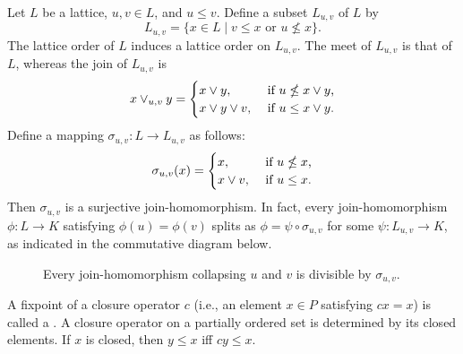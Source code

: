 \newcommand{\Luv}{\ensuremath{L_{u,v}}}
\newcommand{\juv}{\ensuremath{\vee_{u,v}}}
\newcommand{\suv}{\ensuremath{\sigma_{u,v}}}
\begin{example}
  Let $L$ be a lattice, $u, v \in L$, and $u\leq v$.
  Define a subset $\Luv$ of $L$ by
  \[
  \Luv =\{x\in L \mid v\leq x \text{ or } u \nleq x\}.
  \]
  The lattice order of $L$ induces a lattice order on $\Luv$.
  The meet of $\Luv$ is that of $L$, whereas the join of $\Luv$ is
  \[
  x \juv y = 
  \begin{cases}
    x \join y, & \text{ if $u \nleq x \join y$,}\\
    x \join y \join v, & \text{ if $u \leq x \join y$.}
  \end{cases}
  \]
  Define a mapping $\suv \colon L \to \Luv$ as follows:
  \[
  \suv (x)  = 
  \begin{cases}
    x, & \text{ if $u \nleq x$,}\\
    x \join v, & \text{ if $u \leq x$.}
  \end{cases}
  \]
  Then $\suv$ is a surjective join-homomorphism. In fact, every
  join-homomorphism $\phi \colon L \to K$ satisfying $\phi(u) = \phi(v)$ splits as
  $\phi =  \psi \circ \suv$ for some $\psi \colon \Luv \to K$, as indicated
  in the commutative diagram below.

  \begin{center}
    \begin{figure}
      \caption{Every join-homomorphism collapsing $u$ and $v$ is divisible by $\suv$.}
      \label{tab:splitting}
    \end{figure}
  \end{center}

  
\end{example}

A fixpoint of a closure operator $c$ (i.e., an element $x\in P$ satisfying
$c x = x$) is called a .
A closure operator on a partially ordered
set is determined by its closed elements. If $x$ is closed, then
$y \leq x$ iff $c y \leq x$.


